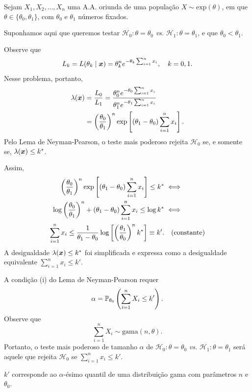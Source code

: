 \begin{example}
Sejam $X_1,X_2,\ldots,X_n$ uma A.A. oriunda de uma população $X\sim\text{exp}(\theta)$, em que $\theta\in\{\theta_0,\theta_1\}$, com $\theta_0$ e $\theta_1$ números fixados.

Suponhamos aqui que queremos testar $\mathcal{H}_0:\theta=\theta_0$ \emph{vs.} $\mathcal{H}_1:\theta=\theta_1$, e que $\theta_0<\theta_1$.

Observe que
\begin{equation}
L_k=L(\theta_k\mid\v{x})=\theta_k^n e^{-\theta_k\sum_{i=1}^n x_i}, \quad k=0,1.
\end{equation}
Nesse problema, portanto,
\begin{align}
\lambda(\v{x}) &= \frac{L_0}{L_1}=\frac{\theta_0^n e^{-\theta_0\sum_{i=1}^n x_i}}{\theta_1^n e^{-\theta_1\sum_{i=1}^n x_i}}\notag\\
&= \left(\frac{\theta_0}{\theta_1}\right)^n\exp\left[(\theta_1-\theta_0)\sum_{i=1}^n x_i\right].
\end{align}
Pelo Lema de Neyman-Pearson, o teste mais poderoso rejeita $\mathcal{H}_0$ se, e somente se, $\lambda(\v{x})\leq k^*$.

Assim,
\begin{align}
\left(\frac{\theta_0}{\theta_1}\right)^n\exp\left[(\theta_1-\theta_0)\sum_{i=1}^n x_i\right]\leq k^* &\iff\notag\\
\log\left(\frac{\theta_0}{\theta_1}\right)^n+(\theta_1-\theta_0)\sum_{i=1}^n x_i\leq\log k^* &\iff\notag\\
\sum_{i=1}^n x_i\leq\frac{1}{\theta_1-\theta_0}\log\left[\left(\frac{\theta_1}{\theta_0}\right)^n k^*\right]\equiv k'. & \quad\text{(constante)}
\end{align}
A desigualdade $\lambda(\v{x})\leq k^*$ foi simplificada e expressa como a desigualdade equivalente $\sum_{i=1}^n x_i\leq k'$.

A condição (i) do Lema de Neyman-Pearson requer
\begin{equation}
\alpha=\P_{\theta_0}\left(\sum_{i=1}^n X_i\leq k'\right).
\end{equation}
Observe que
\begin{equation}
\sum_{i=1}^n X_i\sim\text{gama}(n,\theta).
\end{equation}
Portanto, o teste mais poderoso de tamanho $\alpha$ de $\mathcal{H}_0:\theta=\theta_0$ \emph{vs.} $\mathcal{H}_1:\theta=\theta_1$ será aquele que rejeita $\mathcal{H}_0$ se $\sum_{i=1}^n x_i\leq k'$.

$k'$ corresponde ao $\alpha$-ésimo quantil de uma distribuição gama com parâmetros $n$ e $\theta_0$.
\end{example}


